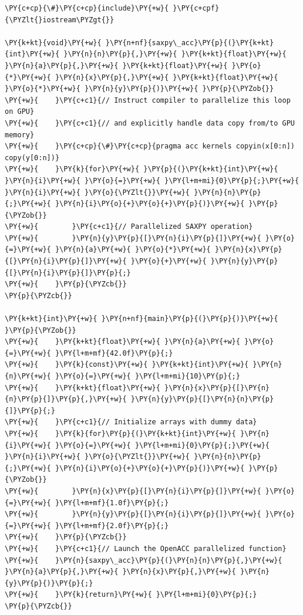\begin{Verbatim}[label=\makebox{\url{https://github.com/lucabaldini/cmepda/tree/master/slides/latex/snippets/openacc_saxpy.cpp}},commandchars=\\\{\}]
\PY{c+cp}{\#}\PY{c+cp}{include}\PY{+w}{ }\PY{c+cpf}{\PYZlt{}iostream\PYZgt{}}

\PY{k+kt}{void}\PY{+w}{ }\PY{n+nf}{saxpy\_acc}\PY{p}{(}\PY{k+kt}{int}\PY{+w}{ }\PY{n}{n}\PY{p}{,}\PY{+w}{ }\PY{k+kt}{float}\PY{+w}{ }\PY{n}{a}\PY{p}{,}\PY{+w}{ }\PY{k+kt}{float}\PY{+w}{ }\PY{o}{*}\PY{+w}{ }\PY{n}{x}\PY{p}{,}\PY{+w}{ }\PY{k+kt}{float}\PY{+w}{ }\PY{o}{*}\PY{+w}{ }\PY{n}{y}\PY{p}{)}\PY{+w}{ }\PY{p}{\PYZob{}}
\PY{+w}{    }\PY{c+c1}{// Instruct compiler to parallelize this loop on GPU}
\PY{+w}{    }\PY{c+c1}{// and explicitly handle data copy from/to GPU memory}
\PY{+w}{    }\PY{c+cp}{\#}\PY{c+cp}{pragma acc kernels copyin(x[0:n]) copy(y[0:n])}
\PY{+w}{    }\PY{k}{for}\PY{+w}{ }\PY{p}{(}\PY{k+kt}{int}\PY{+w}{ }\PY{n}{i}\PY{+w}{ }\PY{o}{=}\PY{+w}{ }\PY{l+m+mi}{0}\PY{p}{;}\PY{+w}{ }\PY{n}{i}\PY{+w}{ }\PY{o}{\PYZlt{}}\PY{+w}{ }\PY{n}{n}\PY{p}{;}\PY{+w}{ }\PY{n}{i}\PY{o}{+}\PY{o}{+}\PY{p}{)}\PY{+w}{ }\PY{p}{\PYZob{}}
\PY{+w}{        }\PY{c+c1}{// Parallelized SAXPY operation}
\PY{+w}{        }\PY{n}{y}\PY{p}{[}\PY{n}{i}\PY{p}{]}\PY{+w}{ }\PY{o}{=}\PY{+w}{ }\PY{n}{a}\PY{+w}{ }\PY{o}{*}\PY{+w}{ }\PY{n}{x}\PY{p}{[}\PY{n}{i}\PY{p}{]}\PY{+w}{ }\PY{o}{+}\PY{+w}{ }\PY{n}{y}\PY{p}{[}\PY{n}{i}\PY{p}{]}\PY{p}{;}
\PY{+w}{    }\PY{p}{\PYZcb{}}
\PY{p}{\PYZcb{}}

\PY{k+kt}{int}\PY{+w}{ }\PY{n+nf}{main}\PY{p}{(}\PY{p}{)}\PY{+w}{ }\PY{p}{\PYZob{}}
\PY{+w}{    }\PY{k+kt}{float}\PY{+w}{ }\PY{n}{a}\PY{+w}{ }\PY{o}{=}\PY{+w}{ }\PY{l+m+mf}{42.0f}\PY{p}{;}
\PY{+w}{    }\PY{k}{const}\PY{+w}{ }\PY{k+kt}{int}\PY{+w}{ }\PY{n}{n}\PY{+w}{ }\PY{o}{=}\PY{+w}{ }\PY{l+m+mi}{10}\PY{p}{;}
\PY{+w}{    }\PY{k+kt}{float}\PY{+w}{ }\PY{n}{x}\PY{p}{[}\PY{n}{n}\PY{p}{]}\PY{p}{,}\PY{+w}{ }\PY{n}{y}\PY{p}{[}\PY{n}{n}\PY{p}{]}\PY{p}{;}
\PY{+w}{    }\PY{c+c1}{// Initialize arrays with dummy data}
\PY{+w}{    }\PY{k}{for}\PY{p}{(}\PY{k+kt}{int}\PY{+w}{ }\PY{n}{i}\PY{+w}{ }\PY{o}{=}\PY{+w}{ }\PY{l+m+mi}{0}\PY{p}{;}\PY{+w}{ }\PY{n}{i}\PY{+w}{ }\PY{o}{\PYZlt{}}\PY{+w}{ }\PY{n}{n}\PY{p}{;}\PY{+w}{ }\PY{n}{i}\PY{o}{+}\PY{o}{+}\PY{p}{)}\PY{+w}{ }\PY{p}{\PYZob{}}
\PY{+w}{        }\PY{n}{x}\PY{p}{[}\PY{n}{i}\PY{p}{]}\PY{+w}{ }\PY{o}{=}\PY{+w}{ }\PY{l+m+mf}{1.0f}\PY{p}{;}
\PY{+w}{        }\PY{n}{y}\PY{p}{[}\PY{n}{i}\PY{p}{]}\PY{+w}{ }\PY{o}{=}\PY{+w}{ }\PY{l+m+mf}{2.0f}\PY{p}{;}
\PY{+w}{    }\PY{p}{\PYZcb{}}
\PY{+w}{    }\PY{c+c1}{// Launch the OpenACC parallelized function}
\PY{+w}{    }\PY{n}{saxpy\_acc}\PY{p}{(}\PY{n}{n}\PY{p}{,}\PY{+w}{ }\PY{n}{a}\PY{p}{,}\PY{+w}{ }\PY{n}{x}\PY{p}{,}\PY{+w}{ }\PY{n}{y}\PY{p}{)}\PY{p}{;}
\PY{+w}{    }\PY{k}{return}\PY{+w}{ }\PY{l+m+mi}{0}\PY{p}{;}
\PY{p}{\PYZcb{}}
\end{Verbatim}